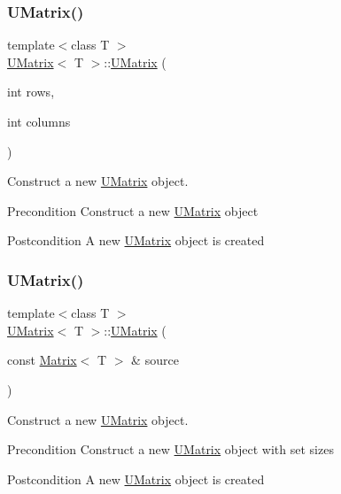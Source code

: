 \subsubsection{\texorpdfstring{UMatrix()}{UMatrix()}\hspace{0.1cm}{\footnotesize\ttfamily [1/3]}}
{\footnotesize\ttfamily template$<$class T $>$ \\
\mbox{\hyperlink{class_u_matrix}{U\+Matrix}}$<$ T $>$\+::\mbox{\hyperlink{class_u_matrix}{U\+Matrix}} (\begin{DoxyParamCaption}\item[{int}]{rows,  }\item[{int}]{columns }\end{DoxyParamCaption})}



Construct a new \mbox{\hyperlink{class_u_matrix}{U\+Matrix}} object. 

\begin{DoxyPrecond}{Precondition}
Construct a new \mbox{\hyperlink{class_u_matrix}{U\+Matrix}} object 
\end{DoxyPrecond}
\begin{DoxyPostcond}{Postcondition}
A new \mbox{\hyperlink{class_u_matrix}{U\+Matrix}} object is created 
\end{DoxyPostcond}
\mbox{\label{class_u_matrix_a784cebb7d674ada97720bcb34f49ca6b}} 
\subsubsection{\texorpdfstring{UMatrix()}{UMatrix()}\hspace{0.1cm}{\footnotesize\ttfamily [2/3]}}
{\footnotesize\ttfamily template$<$class T $>$ \\
\mbox{\hyperlink{class_u_matrix}{U\+Matrix}}$<$ T $>$\+::\mbox{\hyperlink{class_u_matrix}{U\+Matrix}} (\begin{DoxyParamCaption}\item[{const \mbox{\hyperlink{class_matrix}{Matrix}}$<$ T $>$ \&}]{source }\end{DoxyParamCaption})}



Construct a new \mbox{\hyperlink{class_u_matrix}{U\+Matrix}} object. 

\begin{DoxyPrecond}{Precondition}
Construct a new \mbox{\hyperlink{class_u_matrix}{U\+Matrix}} object with set sizes 
\end{DoxyPrecond}
\begin{DoxyPostcond}{Postcondition}
A new \mbox{\hyperlink{class_u_matrix}{U\+Matrix}} object is created 
\end{DoxyPostcond}

